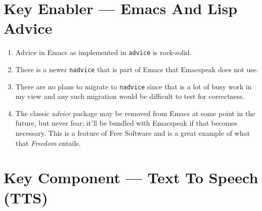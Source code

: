 \documentclass[11pt]{article}
\begin{document}
\section{Key Enabler — Emacs And Lisp Advice}
\label{sec:orgeb13990}

\begin{enumerate}
\item Advice in Emacs as implemented in \texttt{advice} is rock-solid.
\item There is a newer \texttt{nadvice} that is part of Emacs that Emacspeak
does not use.

\item There are no plans to migrate to \texttt{nadvice} since that is a lot of
busy work in my view and any such migration would be difficult
to test for correctness.
\item The classic \emph{advice} package may be removed from Emacs at some
point in the future, but never fear; it'll be bundled with
Emacspeak if that becomes necessary. This is a feature of Free Software and is a great
example of what that \emph{Freedom} entails.
\end{enumerate}
\section{Key Component —  Text To Speech (TTS)}
\label{sec:org8a6bf1a}
\end{document}
